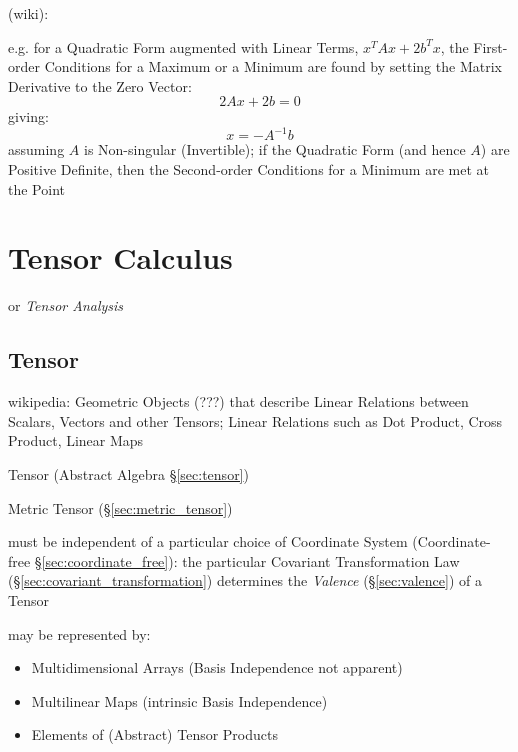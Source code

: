 (wiki):

e.g. for a Quadratic Form augmented with Linear Terms, $x^TAx + 2b^Tx$, the
First-order Conditions for a Maximum or a Minimum are found by setting the
Matrix Derivative to the Zero Vector:
\[
  2Ax + 2b = 0
\]
giving:
\[
  x = -A^{-1}b
\]
assuming $A$ is Non-singular (Invertible); if the Quadratic Form (and hence
$A$) are Positive Definite, then the Second-order Conditions for a
Minimum are met at the Point



\section{Tensor Calculus}\label{sec:tensor_calculus}

or \emph{Tensor Analysis}



\subsection{Tensor}\label{sec:linear_tensor}

wikipedia: Geometric Objects (???) that describe Linear Relations
between Scalars, Vectors and other Tensors; Linear Relations such as
Dot Product, Cross Product, Linear Maps


\fist Tensor (Abstract Algebra \S\ref{sec:tensor})

\fist Metric Tensor (\S\ref{sec:metric_tensor})

must be independent of a particular choice of Coordinate System
(Coordinate-free \S\ref{sec:coordinate_free}): the particular Covariant
Transformation Law (\S\ref{sec:covariant_transformation}) determines
the \emph{Valence} (\S\ref{sec:valence}) of a Tensor

may be represented by:
\begin{itemize}
  \item Multidimensional Arrays (Basis Independence not apparent)
  \item Multilinear Maps (intrinsic Basis Independence)
  \item Elements of (Abstract) Tensor Products
\end{itemize}

